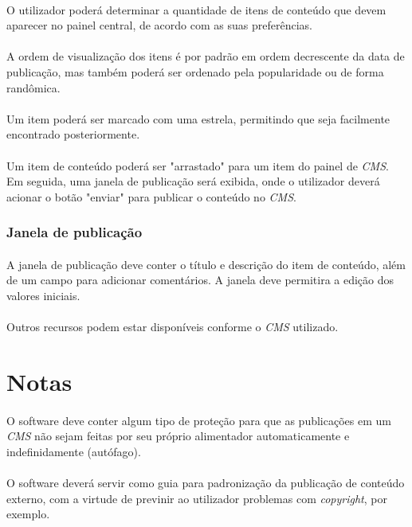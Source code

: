 \documentclass[a4paper,12pt]{article}
\def\cms{\emph{CMS}}
\begin{document}
\paragraph{}
O utilizador poderá determinar a quantidade de itens de conteúdo que devem aparecer no painel central, de acordo com as suas preferências.
\paragraph{}
A ordem de visualização dos itens é por padrão em ordem decrescente da data de publicação, mas também poderá ser ordenado pela popularidade ou de forma randômica.
\paragraph{}
Um item poderá ser marcado com uma estrela, permitindo que seja facilmente encontrado posteriormente.
\paragraph{}
Um item de conteúdo poderá ser "arrastado" para um item do painel de \cms{}. Em seguida, uma janela de publicação será exibida, onde o utilizador deverá acionar o botão "enviar" para publicar o conteúdo no \cms{}.

\subsubsection{Janela de publicação}
\paragraph{}
A janela de publicação deve conter o título e descrição do item de conteúdo, além de um campo para adicionar comentários. A janela deve permitira a edição dos valores iniciais.
\paragraph{}
Outros recursos podem estar disponíveis conforme o \cms{} utilizado.

\section{Notas}

\paragraph{}
O software deve conter algum tipo de proteção para que as publicações em um \cms{} não sejam feitas por seu próprio alimentador automaticamente e indefinidamente (autófago).
\paragraph{}
O software deverá servir como guia para padronização da publicação de conteúdo externo, com a virtude de previnir ao utilizador problemas com \emph{copyright}, por exemplo.
\end{document}
